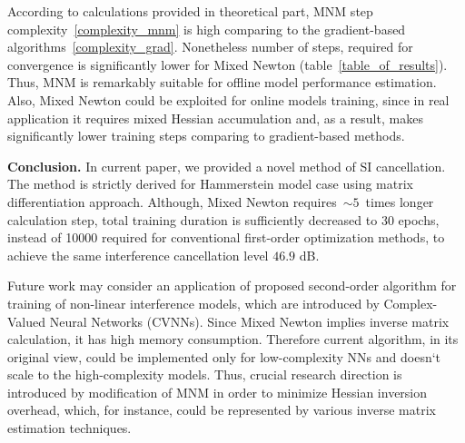 \documentclass[12pt]{article}
\begin{document}
According to calculations provided in theoretical part, MNM step complexity~\eqref{complexity_mnm} is high comparing to the gradient-based algorithms~\eqref{complexity_grad}. Nonetheless number of steps, required for convergence is significantly lower for Mixed Newton (table~\ref{table_of_results}). Thus, MNM is remarkably suitable for offline model performance estimation. Also, Mixed Newton could be exploited for online models training, since in real application it requires mixed Hessian accumulation and, as a result, makes significantly lower training steps comparing to gradient-based methods.

\textbf{Conclusion.}
In current paper, we provided a novel method of SI cancellation. The method is strictly derived for Hammerstein model case using matrix differentiation approach. Although, Mixed Newton requires~$\sim5$~times longer calculation step, total training duration is sufficiently decreased to 30 epochs, instead of 10000 required for conventional first-order optimization methods, to achieve the same interference cancellation level $46.9$ dB. 

Future work may consider an application of proposed second-order algorithm for training of non-linear interference models, which are introduced by Complex-Valued Neural Networks (CVNNs). Since Mixed Newton implies inverse matrix calculation, it has high memory consumption. Therefore current algorithm, in its original view, could be implemented only for low-complexity NNs and doesn`t scale to the high-complexity models. Thus, crucial research direction is introduced by modification of MNM in order to minimize Hessian inversion overhead, which, for instance, could be represented by various inverse matrix estimation techniques.

\AtNextBibliography{\footnotesize}
\printbibliography
\end{document}
